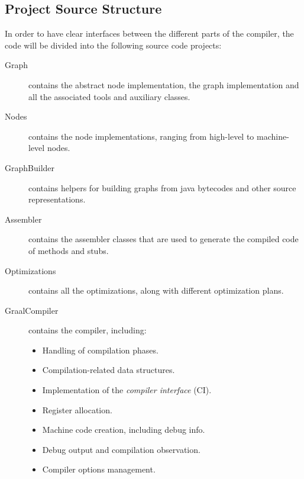 \documentclass[twocolumn]{svjour3}
\begin{document}
\subsection{Project Source Structure}
In order to have clear interfaces between the different parts of the compiler, the code will be divided into the following source code projects:
\begin{description}
    \item[Graph] contains the abstract node implementation, the graph implementation and all the associated tools and auxiliary classes.
    \item[Nodes] contains the node implementations, ranging from high-level to machine-level nodes.
    \item[GraphBuilder] contains helpers for building graphs from java bytecodes and other source representations.
    \item[Assembler] contains the assembler classes that are used to generate the compiled code of methods and stubs.
    \item[Optimizations] contains all the optimizations, along with different optimization plans.
    \item[GraalCompiler] contains the compiler, including:
        \begin{itemize}
            \item Handling of compilation phases.
            \item Compilation-related data structures.
            \item Implementation of the \emph{compiler interface} (CI).
            \item Register allocation.
            \item Machine code creation, including debug info.
            \item Debug output and compilation observation.
            \item Compiler options management.
        \end{itemize}
\end{description}
\end{document}
